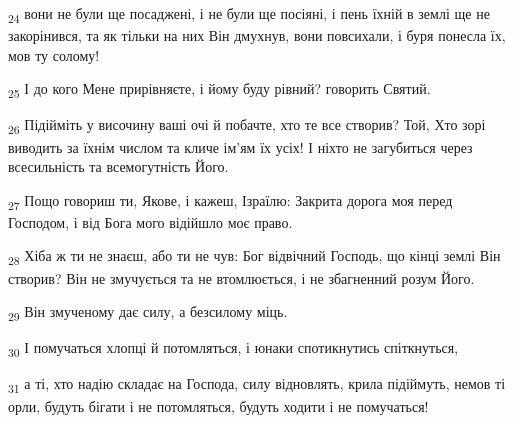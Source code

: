 \begin{tcolorbox}
\textsubscript{24} вони не були ще посаджені, і не були ще посіяні, і пень їхній в землі ще не закорінився, та як тільки на них Він дмухнув, вони повсихали, і буря понесла їх, мов ту солому!
\end{tcolorbox}
\begin{tcolorbox}
\textsubscript{25} І до кого Мене прирівняєте, і йому буду рівний? говорить Святий.
\end{tcolorbox}
\begin{tcolorbox}
\textsubscript{26} Підійміть у височину ваші очі й побачте, хто те все створив? Той, Хто зорі виводить за їхнім числом та кличе ім'ям їх усіх! І ніхто не загубиться через всесильність та всемогутність Його.
\end{tcolorbox}
\begin{tcolorbox}
\textsubscript{27} Пощо говориш ти, Якове, і кажеш, Ізраїлю: Закрита дорога моя перед Господом, і від Бога мого відійшло моє право.
\end{tcolorbox}
\begin{tcolorbox}
\textsubscript{28} Хіба ж ти не знаєш, або ти не чув: Бог відвічний Господь, що кінці землі Він створив? Він не змучується та не втомлюється, і не збагненний розум Його.
\end{tcolorbox}
\begin{tcolorbox}
\textsubscript{29} Він змученому дає силу, а безсилому міць.
\end{tcolorbox}
\begin{tcolorbox}
\textsubscript{30} І помучаться хлопці й потомляться, і юнаки спотикнутись спіткнуться,
\end{tcolorbox}
\begin{tcolorbox}
\textsubscript{31} а ті, хто надію складає на Господа, силу відновлять, крила підіймуть, немов ті орли, будуть бігати і не потомляться, будуть ходити і не помучаться!
\end{tcolorbox}

